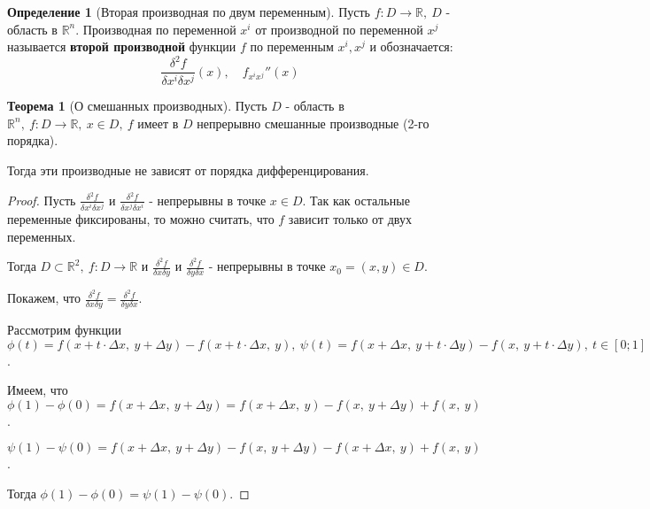 \documentclass{report}
\theoremstyle{definition}
\newtheorem{definition}{Определение}[section]
\newtheorem{theorem}{Теорема}[section]
\begin{document}
\begin{definition}[Вторая производная по двум переменным]
  Пусть $f:D\rightarrow\mathbb{R}, \ D$ - область в $\mathbb{R}^n$. Производная по переменной $x^i$ от производной по переменной $x^j$ называется \textbf{второй производной} функции $f$ по переменным $x^i, x^j$ и обозначается:
  \begin{equation*}
    \frac{\delta^2 f}{\delta x^i \delta x^j}(x), \quad f_{x^ix^j}''(x)
  \end{equation*}
\end{definition}

\begin{theorem}[О смешанных производных]
  Пусть $D$ - область в $\mathbb{R}^n, \ f: D\rightarrow\mathbb{R}, \ x \in D, \ f$ имеет в $D$ непрерывно смешанные производные (2-го порядка).

  Тогда эти производные не зависят от порядка дифференцирования.
\end{theorem}

\begin{proof}
  Пусть $\frac{\delta^2 f}{\delta x^i \delta x^j}$ и $\frac{\delta^2 f}{\delta x^j \delta x^i}$ - непрерывны в точке $x \in D$. Так как остальные переменные фиксированы, то можно считать, что $f$ зависит только от двух переменных.

  Тогда $D\subset\mathbb{R}^2, \ f:D\rightarrow\mathbb{R}$ и $\frac{\delta^2 f}{\delta x \delta y}$ и $\frac{\delta^2 f}{\delta y \delta x}$ - непрерывны в точке $x_0 = (x,y) \in D$.

  Покажем, что $\frac{\delta^2 f}{\delta x \delta y} = \frac{\delta^2 f}{\delta y \delta x}$.

  Рассмотрим функции $\phi(t) = f(x+t\cdot\Delta x, \ y + \Delta y) - f(x+t\cdot\Delta x, \ y), \ \psi(t) = f(x + \Delta x, \ y + t\cdot\Delta y) - f(x, \ y + t \cdot \Delta y), \ t \in [0;1]$.

  Имеем, что $\phi(1) - \phi(0) = f(x + \Delta x, \ y + \Delta y) = f(x + \Delta x, \ y) - f(x, \ y + \Delta y) + f(x, \ y)$.

  $\psi(1) - \psi(0) = f(x + \Delta x, \ y + \Delta y) - f(x, \ y + \Delta y) - f(x + \Delta x, \ y) + f(x, \ y)$.

  Тогда $\phi(1) - \phi(0) = \psi(1) - \psi(0)$.
\end{proof}
\end{document}
